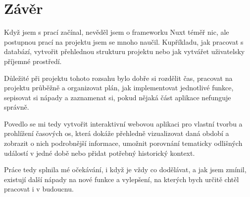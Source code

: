 \section{Závěr}

Když jsem s prací začínal, nevěděl jsem o frameworku Nuxt téměř nic, ale postupnou prací na projektu jsem se mnoho naučil. Kupříkladu, jak pracovat s databází, vytvořit přehlednou strukturu projektu nebo jak vytvářet uživatelsky příjemné prostředí.

Důležité při projektu tohoto rozsahu bylo dobře si rozdělit čas, pracovat na projektu průběžně a organizovat plán, jak implementovat jednotlivé funkce, sepisovat si nápady a zaznamenat si, pokud nějaká část aplikace nefunguje správně.

Povedlo se mi tedy vytvořit interaktivní webovou aplikaci pro vlastní tvorbu a prohlížení časových os, která dokáže přehledně vizualizovat daná období a zobrazit o nich podrobnější informace, umožnit porovnání tematicky odlišných událostí v jedné době nebo přidat potřebný historický kontext. 

Práce tedy splnila mé očekávání, i když je vždy co dodělávat, a jak jsem zmínil, existují další nápady na nové funkce a vylepšení, na kterých bych určitě chtěl pracovat i v budoucnu.
